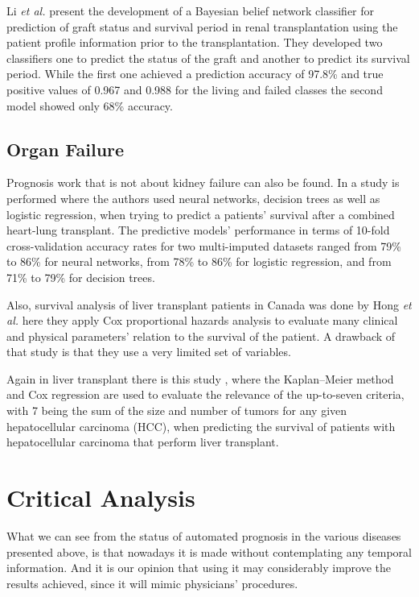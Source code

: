 Li \emph{et al.} \cite{Li2010} present the development of a Bayesian belief network classifier for prediction of graft status and 
survival period in renal transplantation using the patient profile information prior to the transplantation. They developed two
 classifiers one to predict the status of the graft and another to predict its survival period. While the first one achieved a prediction
 accuracy of 97.8\% and true positive values of 0.967 and 0.988 for the living and failed classes the second model showed only 68\% accuracy.
 
 \subsection{Organ Failure}
 \label{subsection:organ}
 
 Prognosis work that is not about kidney failure can also be found. In \cite{Oztekin2009} a study is performed where the authors
 used neural networks, decision trees as well as logistic regression, when trying to predict a patients’ survival after a combined heart-lung
 transplant. The predictive models’ performance in terms of 10-fold cross-validation accuracy rates for two multi-imputed datasets ranged 
 from 79\% to 86\% for neural networks, from 78\% to 86\% for logistic regression, and from 71\% to 79\% for decision trees.

Also, survival analysis of liver transplant patients in Canada was done by Hong \emph{et al.} \cite{Hong2006} here they apply Cox proportional 
hazards analysis to evaluate many clinical and physical parameters’ relation to the survival of the patient. A drawback of that study is that
 they use a very limited set of variables.

Again in liver transplant there is this study \cite{Ataide2012}, where the Kaplan–Meier method and Cox regression are used to evaluate
 the relevance of the up-to-seven criteria, with 7 being the sum of the size and number of tumors for any given hepatocellular carcinoma (HCC),
 when predicting the survival of patients with hepatocellular carcinoma that perform liver transplant. 

 \section{Critical Analysis}
 \label{section:analysis}
 
 What we can see from the status of automated prognosis in the various diseases presented above, is that nowadays it is made without 
 contemplating any temporal information. And it is our opinion that using it may considerably improve the results achieved, since it
 will mimic physicians’ procedures. 

